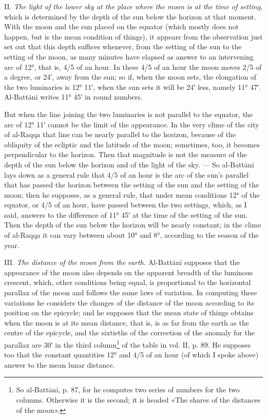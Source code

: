 \documentclass[11pt]{article}
\begin{document}
\begin{center}\end{center}
\par II. \emph{The light of the lower sky at the place where the moon is at the time of setting}, which is determined by the depth of the sun below the horizon at that moment. With the moon and the sun placed on the equator (which mostly does not happen, but is the mean condition of things), it appears from the observation just set out that this depth suffices whenever, from the setting of the sun to the setting of the moon, as many minutes have elapsed as answer to an intervening arc of 12°, that is, 4/5 of an hour. In these 4/5 of an hour the moon moves 2/5 of a degree, or 24′, away from the sun; so if, when the moon sets, the elongation of the two luminaries is 12° 11′, when the sun sets it will be 24′ less, namely 11° 47′. Al-Battānī writes 11° 45′ in round numbers.\par
\par But when the line joining the two luminaries is not parallel to the equator, the arc of 12° 11′ cannot be the limit of the appearance. In the very clime of the city of al-Raqqa that line can be nearly parallel to the horizon, because of the obliquity of the ecliptic and the latitude of the moon; sometimes, too, it becomes perpendicular to the horizon. Then that magnitude is not the measure of the depth of the sun below the horizon and of the light of the sky. — So al-Battānī lays down as a general rule that 4/5 of an hour is the arc of the sun's parallel that has passed the horizon between the setting of the sun and the setting of the moon; then he supposes, as a general rule, that under mean conditions 12° of the equator, or 4/5 of an hour, have passed between the two settings, which, as I said, answers to the difference of 11° 45′ at the time of the setting of the sun. Then the depth of the sun below the horizon will be nearly constant; in the clime of al-Raqqa it can vary between about 10° and 8°, according to the season of the year.\par
\par III. \emph{The distance of the moon from the earth.} Al-Battānī supposes that the appearance of the moon also depends on the apparent breadth of the luminous crescent, which, other conditions being equal, is proportional to the horizontal parallax of the moon and follows the same laws of variation. In computing these variations he considers the changes of the distance of the moon according to its position on the epicycle; and he supposes that the mean state of things obtains when the moon is at its mean distance, that is, is as far from the earth as the centre of the epicycle, and the sixtieths of the correction of the anomaly for the parallax are 30′ in the third column\footnote{So al-Battānī, p. 87, for he computes two series of numbers for the two columns. Otherwise it is the second; it is headed «The shares of the distances of the moon».} of the table in vol. II, p. 89. He supposes too that the constant quantities 12° and 4/5 of an hour (of which I spoke above) answer to the mean lunar distance.\par
\end{document}
